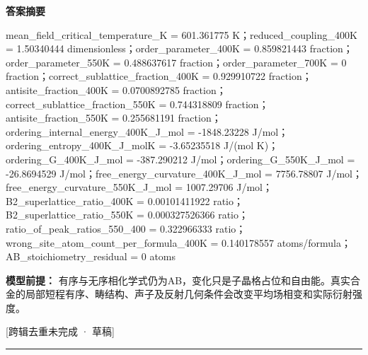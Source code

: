 \documentclass[UTF8,11pt,a4paper]{ctexart}
\begin{document}
\noindent\textbf{答案摘要}\par
mean\_field\_critical\_temperature\_K = 601.361775 K；reduced\_coupling\_400K = 1.50340444 dimensionless；order\_parameter\_400K = 0.859821443 fraction；order\_parameter\_550K = 0.488637617 fraction；order\_parameter\_700K = 0 fraction；correct\_sublattice\_fraction\_400K = 0.929910722 fraction；antisite\_fraction\_400K = 0.0700892785 fraction；correct\_sublattice\_fraction\_550K = 0.744318809 fraction；antisite\_fraction\_550K = 0.255681191 fraction；ordering\_internal\_energy\_400K\_J\_mol = -1848.23228 J/mol；ordering\_entropy\_400K\_J\_molK = -3.65235518 J/(mol K)；ordering\_G\_400K\_J\_mol = -387.290212 J/mol；ordering\_G\_550K\_J\_mol = -26.8694529 J/mol；free\_energy\_curvature\_400K\_J\_mol = 7756.78807 J/mol；free\_energy\_curvature\_550K\_J\_mol = 1007.29706 J/mol；B2\_superlattice\_ratio\_400K = 0.00101411922 ratio；B2\_superlattice\_ratio\_550K = 0.000327526366 ratio；ratio\_of\_peak\_ratios\_550\_400 = 0.322966333 ratio；wrong\_site\_atom\_count\_per\_formula\_400K = 0.140178557 atoms/formula；AB\_stoichiometry\_residual = 0 atoms\par
\noindent\textbf{模型前提：}
有序与无序相化学式仍为AB，变化只是子晶格占位和自由能。真实合金的局部短程有序、畴结构、声子及反射几何条件会改变平均场相变和实际衍射强度。\par
\noindent\textcolor{red!65!black}{[跨辑去重未完成 · 草稿]} \par
\medskip\hrule\medskip
{}
\end{document}
